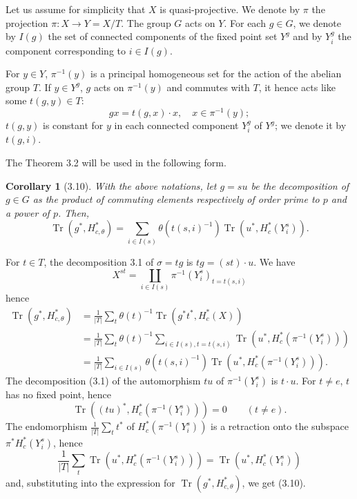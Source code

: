 \documentclass[11pt]{amsart}
\theoremstyle{plain}
\newtheorem{corollary}[theorem]{Corollary}
\theoremstyle{remark}
\DeclareMathOperator{\Tr}{Tr}
\begin{document}
Let us assume for simplicity that $X$ is quasi-projective. We denote by $\pi$ the projection $\pi: X \to Y = X/T$. The group $G$ acts on $Y$. For each $g \in G$, we denote by $I(g)$ the set of connected components of the fixed point set $Y^g$ and by $Y_i^g$ the component corresponding to $i \in I(g)$.

For $y \in Y$, $\pi^{-1}(y)$ is a principal homogeneous set for the action of the abelian group $T$. If $y \in Y^g$, $g$ acts on $\pi^{-1}(y)$ and commutes with $T$, it hence acts like some $t(g, y) \in T$:
\[
gx = t(g, x) \cdot x, \quad x \in \pi^{-1}(y);
\]
$t(g, y)$ is constant for $y$ in each connected component $Y_i^g$ of $Y^g$; we denote it by $t(g, i)$.

The Theorem 3.2 will be used in the following form.

\begin{corollary}[3.10]
With the above notations, let $g = su$ be the decomposition of $g \in G$ as the product of commuting elements respectively of order prime to $p$ and a power of $p$. Then,
\[
\Tr(g^*, H_{c,\theta}^*) = \sum_{i \in I(s)} \theta(t(s, i)^{-1}) \Tr(u^*, H_c^*(Y_i^s)).
\]
\end{corollary}

For $t \in T$, the decomposition 3.1 of $\sigma = tg$ is $tg = (st) \cdot u$. We have
\[
X^{st} = \coprod_{i \in I(s)} \pi^{-1}(Y_i^s)_{t = t(s, i)}
\]
hence
\begin{align*}
\Tr(g^*, H_{c,\theta}^*) &= \frac{1}{|T|} \sum_t \theta(t)^{-1} \Tr(g^*t^*, H_c^*(X)) \\
&= \frac{1}{|T|} \sum_t \theta(t)^{-1} \sum_{i \in I(s), t = t(s, i)} \Tr(u^*, H_c^*(\pi^{-1}(Y_i^s))) \\
&= \frac{1}{|T|} \sum_{i \in I(s)} \theta(t(s, i)^{-1}) \Tr(u^*, H_c^*(\pi^{-1}(Y_i^s))).
\end{align*}
The decomposition (3.1) of the automorphism $tu$ of $\pi^{-1}(Y_i^s)$ is $t \cdot u$. For $t \neq e$, $t$ has no fixed point, hence
\[
\Tr((tu)^*, H_c^*(\pi^{-1}(Y_i^s))) = 0 \qquad (t \neq e).
\]
The endomorphism $\frac{1}{|T|}\sum_t t^*$ of $H_c^*(\pi^{-1}(Y_i^s))$ is a retraction onto the subspace $\pi^* H_c^*(Y_i^s)$, hence
\[
\frac{1}{|T|} \sum_t \Tr(u^*, H_c^*(\pi^{-1}(Y_i^s))) = \Tr(u^*, H_c^*(Y_i^s))
\]
and, substituting into the expression for $\Tr(g^*, H_{c,\theta}^*)$, we get (3.10).
\end{document}
